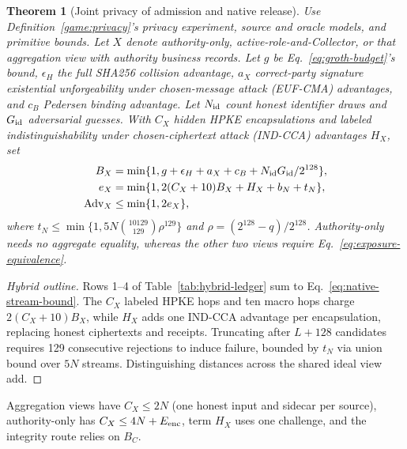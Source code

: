\documentclass[conference,compsoc]{IEEEtran}
\theoremstyle{definition}
\numberwithin{equation}{section}
\numberwithin{table}{section}
\numberwithin{figure}{section}
\theoremstyle{plain}
\newtheorem{theorem}{Theorem}[section]
\newtheorem{theorem}{Theorem}
\begin{document}
\begin{theorem}[Joint privacy of admission and native release]
\label{thm:native-single-batch-privacy}
Use Definition~\ref{game:privacy}'s privacy experiment, source and oracle models, and primitive bounds.
Let \(X\) denote authority-only, active-role-and-Collector, or that aggregation view with authority business records.
Let \(g\) be Eq.~\eqref{eq:groth-budget}'s bound, \(\epsilon_H\) the full SHA256 collision advantage, \(a_X\) correct-party signature existential unforgeability under chosen-message attack (EUF-CMA) advantages, and \(c_B\) Pedersen binding advantage. Let \(N_{\rm id}\) count honest identifier draws and \(G_{\rm id}\) adversarial guesses. With \(C_X\) hidden HPKE encapsulations and labeled indistinguishability under chosen-ciphertext attack (IND-CCA) advantages \(H_X\), set
\begin{align}
 B_X&=\min\{1,g+\epsilon_H+a_X+c_B+N_{\rm id}G_{\rm id}/2^{128}\},
 \label{eq:route-bound}\\
 e_X&=\min\{1,2(C_X+10)B_X+H_X+b_N+t_N\},\\
 \operatorname{Adv}_X&\le\min\{1,2e_X\},
 \label{eq:native-joint-bound}
\end{align}
where \(t_N\le\min\{1,5N\binom{10129}{129}\rho^{129}\}\) and
\(\rho=(2^{128}-q)/2^{128}\). Authority-only needs no aggregate equality,
whereas the other two views require Eq.~\eqref{eq:exposure-equivalence}.
\end{theorem}
\begin{proof}[Hybrid outline]
Rows 1--4 of Table~\ref{tab:hybrid-ledger} sum to Eq.~\eqref{eq:native-stream-bound}. The \(C_X\) labeled HPKE hops and ten macro hops charge \(2(C_X+10)B_X\), while \(H_X\) adds one IND-CCA advantage per encapsulation, replacing honest ciphertexts and receipts. Truncating after \(L+128\) candidates requires 129 consecutive rejections to induce failure, bounded by \(t_N\) via union bound over \(5N\) streams. Distinguishing distances across the shared ideal view add.
\end{proof}
Aggregation views have \(C_X\le2N\) (one honest input and sidecar per source), authority-only has \(C_X\le4N+E_{\rm enc}\), term \(H_X\) uses one challenge, and the integrity route relies on \(B_C\).
\end{document}
